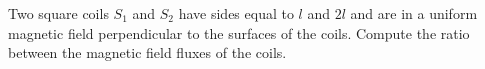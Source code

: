 Two square coils $S_1$ and $S_2$ have sides equal to $l$ and $2l$
and are in a uniform magnetic field perpendicular to the surfaces of the coils. %
Compute the ratio between the magnetic field fluxes 
of the coils.